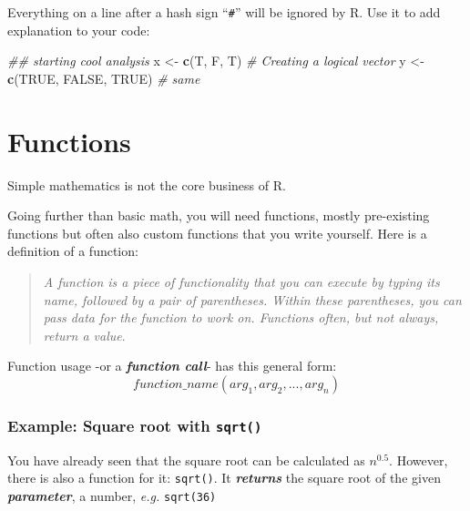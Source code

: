 \documentclass[]{book}
\newenvironment{Shaded}{\begin{snugshade}}{\end{snugshade}}
\newcommand{\CommentTok}[1]{\textcolor[rgb]{0.56,0.35,0.01}{\textit{#1}}}
\newcommand{\KeywordTok}[1]{\textcolor[rgb]{0.13,0.29,0.53}{\textbf{#1}}}
\newcommand{\NormalTok}[1]{#1}
\newcommand{\OtherTok}[1]{\textcolor[rgb]{0.56,0.35,0.01}{#1}}
\newcommand{\StringTok}[1]{\textcolor[rgb]{0.31,0.60,0.02}{#1}}
\begin{document}
Everything on a line after a hash sign ``\texttt{\#}'' will be ignored by R. Use it to add explanation to your code:

\begin{Shaded}
\begin{Highlighting}[]
\CommentTok{## starting cool analysis}
\NormalTok{x <-}\StringTok{ }\KeywordTok{c}\NormalTok{(T, F, T) }\CommentTok{# Creating a logical vector}
\NormalTok{y <-}\StringTok{ }\KeywordTok{c}\NormalTok{(}\OtherTok{TRUE}\NormalTok{, }\OtherTok{FALSE}\NormalTok{, }\OtherTok{TRUE}\NormalTok{) }\CommentTok{# same}
\end{Highlighting}
\end{Shaded}

\hypertarget{functions}{%
\section{Functions}\label{functions}}

Simple mathematics is not the core business of R.

Going further than basic math, you will need functions, mostly pre-existing functions but often also custom functions that you write yourself. Here is a definition of a function:

\begin{quote}
\emph{A function is a piece of functionality that you can execute by typing its name, followed by a pair of parentheses. Within these parentheses, you can pass data for the function to work on. Functions often, but not always, return a value}.
\end{quote}

Function usage -or a \textbf{\emph{function call}}- has this general form:
\[function\_name(arg_1, arg_2, ..., arg_n)\]

\hypertarget{example-square-root-with-sqrt}{%
\subsubsection*{\texorpdfstring{Example: Square root with \texttt{sqrt()}}{Example: Square root with sqrt()}}\label{example-square-root-with-sqrt}}

You have already seen that the square root can be calculated as \(n^{0.5}\).
However, there is also a function for it: \texttt{sqrt()}. It \textbf{\emph{returns}} the square root of the given \textbf{\emph{parameter}}, a number, \emph{e.g.} \texttt{sqrt(36)}
\end{document}
